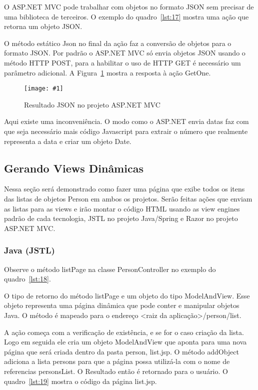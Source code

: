 \documentclass[a4paper,12pt]{article}
\newcommand{\figura}[3] {
	\begin{figure}[ht]
		\centering
		\texttt{[image: \#1]}
		\caption{#2}
		\label{#3}
	\end{figure}
	\FloatBarrier
}
\newcommand{\javacode}[3] {
	
	\FloatBarrier
}
\newcommand{\sharpcode}[3] {
	
	\FloatBarrier
}
\begin{document}
O ASP.NET MVC pode trabalhar com objetos no formato JSON sem precisar de uma biblioteca de terceiros. O exemplo do quadro~\ref{lst:17} mostra uma ação que retorna um objeto JSON.

\sharpcode{code/17.txt}{Ação no ASP.NET MVC que retorna um objeto JSON}{lst:17}

O método estático Json no final da ação faz a conversão de objetos para o formato JSON. Por padrão o ASP.NET MVC só envia objetos JSON usando o método HTTP POST, para a habilitar o uso de HTTP GET é necessário um parâmetro adicional. A Figura~\ref{fig:33} mostra a resposta à ação GetOne.

\figura{33.png}{Resultado JSON no projeto ASP.NET MVC}{fig:33}

Aqui existe uma inconveniência. O modo como o ASP.NET envia datas faz com que seja necessário mais código Javascript para extrair o número que realmente representa a data e criar um objeto Date.

\subsection{Gerando Views Dinâmicas}

Nessa seção será demonstrado como fazer uma página que exibe todos os itens das listas de objetos Person em ambos os projetos. Serão feitas ações que enviam as listas para as views e irão montar o código HTML usando as view engines padrão de cada tecnologia, JSTL no projeto Java/Spring e Razor no projeto ASP.NET MVC.

\subsubsection{Java (JSTL)}

Observe o método listPage na classe PersonController no exemplo do quadro~\ref{lst:18}.

\javacode{code/18.txt}{Ação no projeto Java que retorna uma página com a lista de Persons}{lst:18}

O tipo de retorno do método listPage e um objeto do tipo ModelAndView. Esse objeto representa uma página dinâmica que pode conter e manipular objetos Java. O método é mapeado para o endereço <raiz da aplicação>/person/list. 

A ação começa com a verificação de existência, e se for o caso criação da lista. Logo em seguida ele cria um objeto ModelAndView que aponta para uma nova página que será criada dentro da pasta person, list.jsp. O método addObject adiciona a lista persons para que a página possa utilizá-la com o nome de referencias personsList. O Resultado então é retornado para o usuário. O quadro~\ref{lst:19} mostra o código da página list.jsp.
\end{document}

